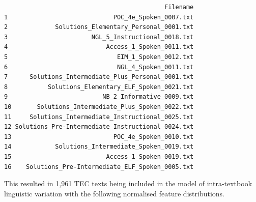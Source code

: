 \documentclass[
  letterpaper,
  DIV=11,
  numbers=noendperiod]{scrreprt}
\newenvironment{Shaded}{\begin{snugshade}}{\end{snugshade}}
\newcommand{\FunctionTok}[1]{\textcolor[rgb]{0.28,0.35,0.67}{#1}}
\newcommand{\NormalTok}[1]{\textcolor[rgb]{0.00,0.23,0.31}{#1}}
\newcommand{\OtherTok}[1]{\textcolor[rgb]{0.00,0.23,0.31}{#1}}
\newcommand{\SpecialCharTok}[1]{\textcolor[rgb]{0.37,0.37,0.37}{#1}}
\begin{document}
\begin{verbatim}
                                            Filename
1                             POC_4e_Spoken_0007.txt
2             Solutions_Elementary_Personal_0001.txt
3                       NGL_5_Instructional_0018.txt
4                           Access_1_Spoken_0011.txt
5                              EIM_1_Spoken_0012.txt
6                              NGL_4_Spoken_0011.txt
7      Solutions_Intermediate_Plus_Personal_0001.txt
8           Solutions_Elementary_ELF_Spoken_0021.txt
9                          NB_2_Informative_0009.txt
10       Solutions_Intermediate_Plus_Spoken_0022.txt
11     Solutions_Intermediate_Instructional_0025.txt
12 Solutions_Pre-Intermediate_Instructional_0024.txt
13                            POC_4e_Spoken_0010.txt
14            Solutions_Intermediate_Spoken_0019.txt
15                          Access_1_Spoken_0019.txt
16    Solutions_Pre-Intermediate_ELF_Spoken_0005.txt
\end{verbatim}

\begin{Shaded}
\end{Shaded}

This resulted in 1,961 TEC texts being included in the model of
intra-textbook linguistic variation with the following normalised
feature distributions.
\end{document}
